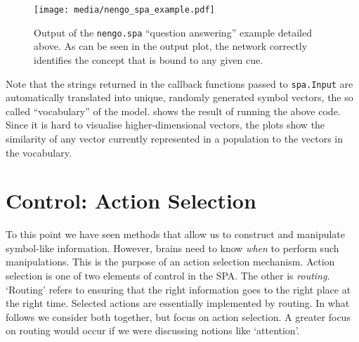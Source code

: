 \documentclass[10pt,letterpaper,oneside]{article}
\begin{document}
\begin{figure}
	\centering\hspace*{-0.33cm}\texttt{[image: media/nengo\_spa\_example.pdf]}
	\caption{Output of the \texttt{nengo.spa} \enquote{question answering} example detailed above. As can be seen in the output plot, the network correctly identifies the concept that is bound to any given cue.}
	\label{fig:nengo_spa_example}
\end{figure}

Note that the strings returned in the callback functions passed to \texttt{spa.Input} are automatically translated into unique, randomly generated symbol vectors, the so called \enquote{vocabulary} of the model.  shows the result of running the above code. Since it is hard to visualise higher-dimensional vectors, the plots show the similarity of any vector currently represented in a population to the vectors in the vocabulary.


\section{Control: Action Selection}


To this point we have seen methods that allow us to construct and manipulate symbol-like information.  However, brains need to know \emph{when} to perform such manipulations.  This is the purpose of an action selection mechanism.  Action selection is one of two elements of control in the SPA. The other is \emph{routing}. `Routing' refers to ensuring that the right information goes to the right place at the right time. Selected actions are essentially implemented by routing. In what follows we consider both together, but focus on action selection.  A greater focus on routing would occur if we were discussing notions like `attention'.
\end{document}
